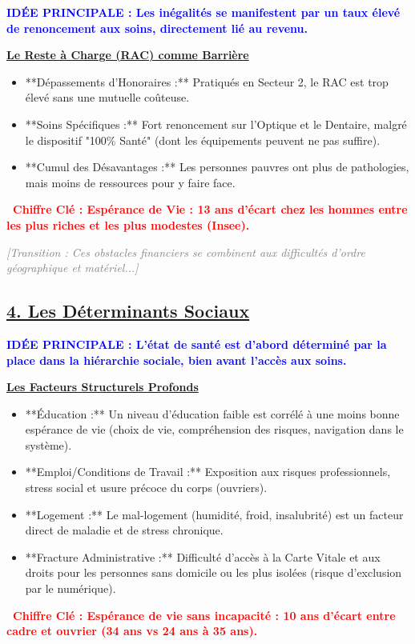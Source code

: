 \documentclass[10pt, a4paper]{article}
\newcommand{\IdeeP}[1]{\noindent\textbf{\textcolor{blue}{IDÉE PRINCIPALE : #1}}\par}
\newcommand{\ChiffreCle}[1]{\noindent\textbf{\textcolor{red}{\textbullet\ Chiffre Clé : #1}}\par}
\newcommand{\SousAxe}[1]{\vspace{0.5em}\noindent\underline{\textbf{#1}}\par}
\newcommand{\Transition}[1]{\vspace{1em}\noindent\textit{\textcolor{gray}{[Transition : #1]}}\par}
\begin{document}
\IdeeP{Les inégalités se manifestent par un taux élevé de renoncement aux soins, directement lié au revenu.}
\SousAxe{Le Reste à Charge (RAC) comme Barrière}
\begin{itemize}
    \item **Dépassements d'Honoraires :** Pratiqués en Secteur 2, le RAC est trop élevé sans une mutuelle coûteuse.
    \item **Soins Spécifiques :** Fort renoncement sur l'Optique et le Dentaire, malgré le dispositif "100\% Santé" (dont les équipements peuvent ne pas suffire).
    \item **Cumul des Désavantages :** Les personnes pauvres ont plus de pathologies, mais moins de ressources pour y faire face.
\end{itemize}
\ChiffreCle{Espérance de Vie : 13 ans d'écart chez les hommes entre les plus riches et les plus modestes (Insee).}

\Transition{Ces obstacles financiers se combinent aux difficultés d'ordre géographique et matériel...}


\subsection*{\underline{4. Les Déterminants Sociaux}}

\IdeeP{L'état de santé est d'abord déterminé par la place dans la hiérarchie sociale, bien avant l'accès aux soins.}
\SousAxe{Les Facteurs Structurels Profonds}
\begin{itemize}
    \item **Éducation :** Un niveau d'éducation faible est corrélé à une moins bonne espérance de vie (choix de vie, compréhension des risques, navigation dans le système).
    \item **Emploi/Conditions de Travail :** Exposition aux risques professionnels, stress social et usure précoce du corps (ouvriers).
    \item **Logement :** Le mal-logement (humidité, froid, insalubrité) est un facteur direct de maladie et de stress chronique.
    \item **Fracture Administrative :** Difficulté d'accès à la Carte Vitale et aux droits pour les personnes sans domicile ou les plus isolées (risque d'exclusion par le numérique).
\end{itemize}
\ChiffreCle{Espérance de vie sans incapacité : 10 ans d'écart entre cadre et ouvrier (34 ans vs 24 ans à 35 ans).}

\end{document}
